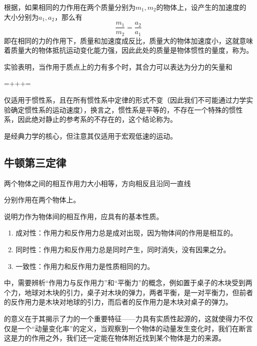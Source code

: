 根据，如果相同的力作用在两个质量分别为$m_1,m_2$的物体上，设产生的加速度的大小分别为$a_1,a_2$，那么有
\begin{equation*}
    \frac{m_1}{m_2}=\frac{a_2}{a_1}
\end{equation*}
即在相同的力的作用下，质量和加速度成反比，质量大的物体加速度小，这就意味着质量大的物体抵抗运动变化能力强，因此此处的质量是物体惯性的量度，称为。

实验表明，当作用于质点上的力有多个时，其合力可以表达为分力的矢量和
\begin{BoxEquation}[力的叠加原理]
    =++\cdots+=
\end{BoxEquation}

仅适用于惯性系，且在所有惯性系中定律的形式不变（因此我们不可能通过力学实验确定惯性系的运动速度），换言之，惯性系是平等的，不存在一个特殊的惯性系，因此绝对静止的参考系的不存在的，这个结论称为。

是经典力学的核心，但注意其仅适用于宏观低速的运动。

\subsection{牛顿第三定律}
\begin{BoxPrinciple}[牛顿第三定律]
    \centering\small
    两个物体之间的相互作用力大小相等，方向相反且沿同一直线

    分别作用在两个物体上。
\end{BoxPrinciple}
说明力作为物体间的相互作用，应具有的基本性质。
\begin{enumerate}
    \item 成对性：作用力和反作用力总是成对出现，因为物体间的作用是相互的。
    \item 同时性：作用力和反作用力总是同时产生，同时消失，没有因果之分。
    \item 一致性：作用力和反作用力是性质相同的力。
\end{enumerate}
中，需要辨析“作用力与反作用力”和“平衡力”的概念，例如置于桌子的木块受到两个力，地球对木块的引力，桌子对木块的弹力，两者平衡，是一对平衡力，但前者的反作用力是木块对地球的引力，而后者的反作用力是木块对桌子的弹力。

的意义在于其揭示了力的一个重要特征——力具有实质性起源的，这就使得力不仅仅是一个“动量变化率”的定义，当观察到一个物体的动量发生变化时，我们在断言这是力的作用之外，我们还一定能在物体附近找到某个物体是力的来源。

